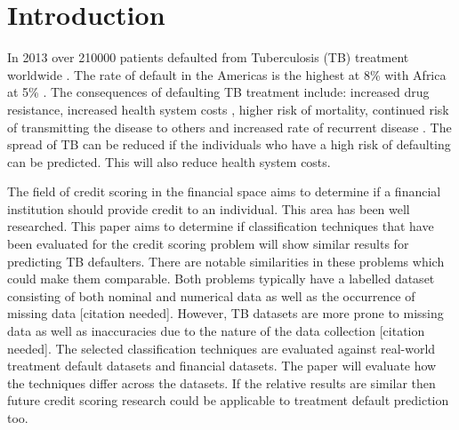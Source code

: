 \documentclass{sig-alternate-05-2015}
\begin{document}
	\maketitle
	\begin{abstract}
	\end{abstract}
	
	\printccsdesc
	
	
	
	\section{Introduction}
	In 2013 over 210\hspace*{1mm}000 patients defaulted from Tuberculosis (TB) treatment worldwide \cite{world2015TB}. The rate of default in the Americas is the highest at 8\% with Africa at 5\% \cite{world2015TB}. The consequences of defaulting TB treatment include: increased drug resistance, increased health system costs \cite{Lackey:10356751520150601, muture:6660173120110101}, higher risk of mortality, continued risk of transmitting the disease to others \cite{Lackey:10356751520150601} and increased rate of recurrent disease \cite{Jha:10.1371/journal.pone.0008873}. The spread of TB can be reduced if the individuals who have a high risk of defaulting can be predicted. This will also reduce health system costs.
	
	The field of credit scoring in the financial space aims to determine if a financial institution should provide credit to an individual. This area has been well researched. This paper aims to determine if classification techniques that have been evaluated for the credit scoring problem will show similar results for predicting TB defaulters. There are notable similarities in these problems which could make them comparable. Both problems typically have a labelled dataset consisting of both nominal and numerical data as well as the occurrence of missing data [citation needed]. However, TB datasets are more prone to missing data as well as inaccuracies due to the nature of the data collection [citation needed]. The selected classification techniques are evaluated against real-world treatment default datasets and financial datasets. The paper will evaluate how the techniques differ across the datasets. If the relative results are similar then future credit scoring research could be applicable to treatment default prediction too.
	
\end{document}
